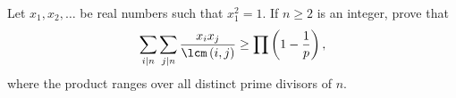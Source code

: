 Let $x_1,x_2,\ldots$ be real numbers such that $x_1^2=1$. If $n\geq2$ is an integer, prove that \[\displaystyle\sum_{i\mid n}\displaystyle\sum_{j\mid n}\frac{x_ix_j}{\lcm\left(i,j\right)}\geq\displaystyle\prod\left(1-\frac{1}{p}\right),\] where the product ranges over all distinct prime divisors of $n$.